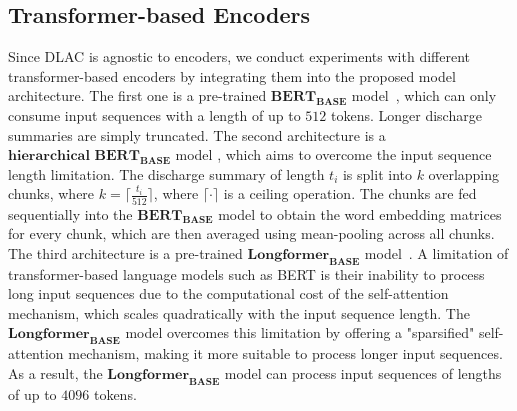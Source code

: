 \documentclass[11pt]{article}
\begin{document}
\subsection{Transformer-based Encoders}
Since DLAC is agnostic to encoders, we conduct experiments with different transformer-based encoders by integrating them into the proposed model architecture.
The first one is a pre-trained \(\textbf{BERT}_{\textbf{BASE}}\) model~\citep{devlin-etal-2019-bert}, which can only consume input sequences with a length of up to $512$ tokens. Longer discharge summaries are simply truncated. The second architecture is a \(\textbf{hierarchical BERT}_{\textbf{BASE}}\) model \citep{pappagari2019hierarchical}, which aims to overcome the input sequence length limitation. The discharge summary of length $t_{i}$ is split into $k$ overlapping chunks, where $k=\lceil\frac{t_{i}}{512}\rceil$, where $\lceil\cdot\rceil$ is a ceiling operation. The chunks are fed sequentially into the \(\textbf{BERT}_{\textbf{BASE}}\) model to obtain the word embedding matrices for every chunk, which are then averaged using mean-pooling across all chunks. The third architecture is a pre-trained \(\textbf{Longformer}_{\textbf{BASE}}\) model~\citep{Longformer}. A limitation of transformer-based language models such as BERT is their inability to process long input sequences due to the computational cost of the self-attention mechanism, which scales quadratically with the input sequence length. The \(\textbf{Longformer}_{\textbf{BASE}}\) model overcomes this limitation by offering a "sparsified" self-attention mechanism, making it more suitable to process longer input sequences. As a result, the \(\textbf{Longformer}_{\textbf{BASE}}\) model can process input sequences of lengths of up to $4096$ tokens.
\end{document}
